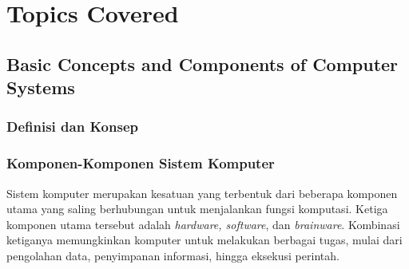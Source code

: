 \documentclass[12pt]{article}
\begin{document}
\section{Topics Covered}

\subsection{Basic Concepts and Components of Computer Systems}
    \subsubsection{Definisi dan Konsep}
    \subsubsection{Komponen-Komponen Sistem Komputer}
    Sistem komputer merupakan kesatuan yang terbentuk dari beberapa komponen utama yang saling berhubungan untuk menjalankan fungsi komputasi. Ketiga komponen utama tersebut adalah \textit{hardware, software}, dan \textit{brainware}. Kombinasi ketiganya memungkinkan komputer untuk melakukan berbagai tugas, mulai dari pengolahan data, penyimpanan informasi, hingga eksekusi perintah.
\end{document}
